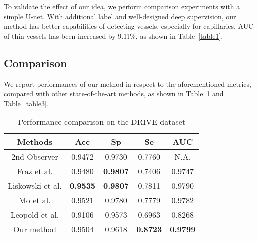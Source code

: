 \documentclass[runningheads,a4paper]{llncs}
\begin{document}
To validate the effect of our idea, we perform comparison experiments with a simple U-net. With additional label and well-designed deep supervision, our method has better capabilities of detecting vessels, especially for capillaries. AUC of thin vessels has been increased by 9.11\%, as shown in Table~\ref{table1}.

\subsection{Comparison}

We report performances of our method in respect to the aforementioned metrics, compared with other state-of-the-art methods, as shown in Table~\ref{table2} and Table~\ref{table3}.
\begin{table}[h]
	\centering
	\vspace{-10pt}
	\caption{Performance comparison on the DRIVE dataset}
	\vspace{-5pt}
	\begin{tabular}{c|c|c|c|c}
		\toprule
		Methods&Acc&Sp&Se&AUC\\
		\midrule	
		2nd Observer&0.9472&0.9730&0.7760&N.A.\\
		Fraz et al. \cite{fraz2012ensemble}	&0.9480	&\textbf{0.9807}	&0.7406	&0.9747\\
		Liskowski et al. \cite{liskowski2016segmenting} &\textbf{0.9535}	&\textbf{0.9807}	&0.7811	&0.9790\\
		Mo et al. \cite{mo2017multi}	&0.9521	&0.9780	&0.7779	&0.9782\\
		Leopold et al. \cite{leopold2017pixelbnn}	&0.9106	&0.9573	&0.6963	&0.8268\\
		Our method	&0.9504	&0.9618	&\textbf{0.8723}	&\textbf{0.9799}\\
		\bottomrule
	\end{tabular}
	\vspace{0pt}
	\label{table2}
\end{table}
\end{document}
